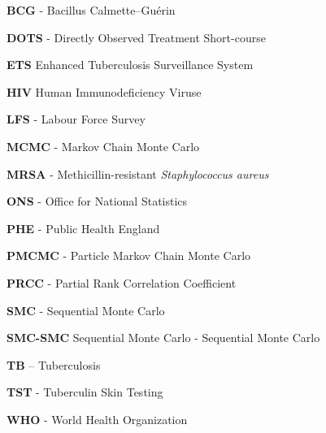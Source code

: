\documentclass[11pt,twoside]{bristolthesis}
\begin{document}
      \listoffigures
      \begin{acronyms}
      \textbf{BCG} - Bacillus Calmette--Guérin
      
      \par
      
      \textbf{DOTS} - Directly Observed Treatment Short-course
      
      \par
      
      \textbf{ETS} Enhanced Tuberculosis Surveillance System
      
      \par
      
      \textbf{HIV} Human Immunodeficiency Viruse
      
      \par
      
      \textbf{LFS} - Labour Force Survey
      
      \par
      
      \textbf{MCMC} - Markov Chain Monte Carlo
      
      \par
      
      \textbf{MRSA} - Methicillin-resistant \emph{Staphylococcus aureus}
      
      \par
      
      \textbf{ONS} - Office for National Statistics
      
      \par
      
      \textbf{PHE} - Public Health England
      
      \par
      
      \textbf{PMCMC} - Particle Markov Chain Monte Carlo
      
      \par
      
      \textbf{PRCC} - Partial Rank Correlation Coefficient
      
      \par
      
      \textbf{SMC} - Sequential Monte Carlo
      
      \par
      
      \textbf{SMC-SMC} Sequential Monte Carlo - Sequential Monte Carlo
      
      \par
      
      \textbf{TB} -- Tuberculosis
      
      \par
      
      \textbf{TST} - Tuberculin Skin Testing
      
      \par
      
      \textbf{WHO} - World Health Organization
      
      \par
    \end{acronyms}
\end{document}
